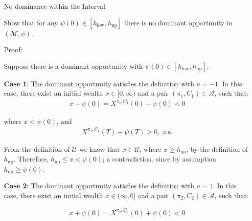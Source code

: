 \documentclass{beamer}
\begin{document}
\begin{frame}{No dominance within the Interval}

    {\footnotesize \footnotesize
    \par Show that for any $\psi(0) \in [h_{\text{low}}, h_{\text{up}}]$ there is no dominant opportunity in $(\mathcal{M}, \psi)$.
    \par Proof:
    \par Suppose there is a dominant opportunity with $\psi(0) \in [h_{\text{low}}, h_{\text{up}}]$.
    \par  \pause \textbf{Case 1}: The dominant opportunity satisfies the definition with $a = -1$. In this case, there exist 
    an initial wealth $x \in [0, \infty)$ and a pair $(\pi_1, C_1) \in \mathcal{A}$, such that:
    \begin{align*}
        x - \psi(0) = X^{\pi_1, C_1}(0) - \psi(0) < 0
    \end{align*}
    \par where $x < \psi(0)$, and
    \begin{align*}
        X^{\pi_1, C_1}(T) - \psi(T) \geq 0, \text{ a.s.}
    \end{align*}
    \par From the definition of $\mathcal{U}$ we know that $x \in \mathcal{U}$, 
    where $x \geq h_{\text{up}}$, by the definition of $h_{\text{up}}$. 
    Therefore, $h_{\text{up}} \leq x < \psi(0)$; a contradiction, since by assumption $h_{\text{up}} \geq \psi(0)$.
    \vspace{1em}
     \par  \pause \textbf{Case 2}: The dominant opportunity satisfies the definition with $a = 1$. In this case, there exist 
    an initial wealth $x \in (\infty,0]$ and a pair $(\pi_2, C_2) \in \mathcal{A}$, such that:

    \begin{align*}
        x + \psi(0) = X^{\pi_2, C_2}(0) + \psi(0) < 0
    \end{align*}
    }

\end{frame} 
\end{document}
